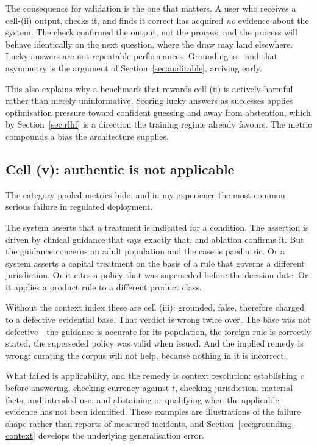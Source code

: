 \documentclass[11pt]{article}
\theoremstyle{plain}
\theoremstyle{definition}
\begin{document}
The consequence for validation is the one that matters. A user who receives a
cell-(ii) output, checks it, and finds it correct has acquired \emph{no} evidence
about the system. The check confirmed the output, not the process, and the process
will behave identically on the next question, where the draw may land elsewhere.
Lucky answers are not repeatable performances. Grounding is---and that asymmetry
is the argument of Section~\ref{sec:auditable}, arriving early.

This also explains why a benchmark that rewards cell (ii) is actively harmful
rather than merely uninformative. Scoring lucky answers as successes applies
optimisation pressure toward confident guessing and away from abstention, which by
Section~\ref{sec:rlhf} is a direction the training regime already favours. The
metric compounds a bias the architecture supplies.

\subsection{Cell (v): authentic is not applicable}
\label{sec:cell-v}

The category pooled metrics hide, and in my experience the most common serious
failure in regulated deployment.

The system asserts that a treatment is indicated for a condition. The assertion is
driven by clinical guidance that says exactly that, and ablation confirms it. But
the guidance concerns an adult population and the case is paediatric. Or a system
asserts a capital treatment on the basis of a rule that governs a different
jurisdiction. Or it cites a policy that was superseded before the decision date. Or
it applies a product rule to a different product class.

Without the context index these are cell (iii): grounded, false, therefore charged
to a defective evidential base. That verdict is wrong twice over. The base was not
defective---the guidance is accurate for its population, the foreign rule is
correctly stated, the superseded policy was valid when issued. And the implied
remedy is wrong: curating the corpus will not help, because nothing in it is
incorrect.

What failed is applicability, and the remedy is context resolution: establishing
$c$ before answering, checking currency against $t$, checking jurisdiction,
material facts, and intended use, and abstaining or qualifying when the applicable
evidence has not been identified. These examples are illustrations of the failure
shape rather than reports of measured incidents, and
Section~\ref{sec:grounding-context} develops the underlying generalisation error.
\end{document}
